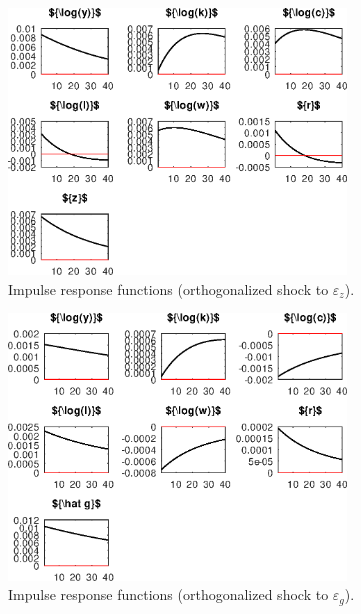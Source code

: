  
\begin{figure}[H]
\centering 
\includegraphics[width=0.80\textwidth]{RBC_IRF/graphs/RBC_IRF_IRF_eps_z}
\caption{Impulse response functions (orthogonalized shock to ${\varepsilon_z}$).}
\label{Fig:IRF:eps_z}
\end{figure}
 
\begin{figure}[H]
\centering 
\includegraphics[width=0.80\textwidth]{RBC_IRF/graphs/RBC_IRF_IRF_eps_g}
\caption{Impulse response functions (orthogonalized shock to ${\varepsilon_g}$).}
\label{Fig:IRF:eps_g}
\end{figure}
 
 
